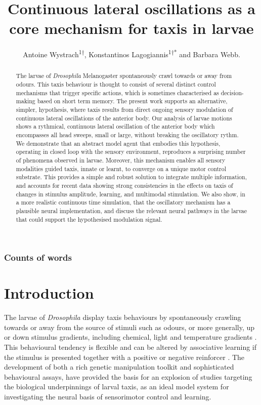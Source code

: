 \documentclass[10pt,a4paper]{article}
\author{Antoine Wystrach\textsuperscript{1†}, Konstantinos Lagogiannis\textsuperscript{1†*} and Barbara Webb.}
\title{Continuous lateral oscillations as a core mechanism for taxis in \Dros larvae}
\newcommand\wordcount{}
\newcommand{\Dros }{\emph{Drosophila }}
\begin{document}
\subsubsection*{Counts of words} 
\wordcount

\maketitle
\begin{abstract}
The larvae of \Dros  Melanogaster spontaneously crawl towards or away from odours. This taxis behaviour is thought to consist of several distinct control mechanisms that trigger specific actions, which is sometimes characterised as decision-making based on short term memory. The present work supports an alternative, simpler, hypothesis, where taxis results from direct ongoing sensory modulation of continuous lateral oscillations of the anterior body. Our analysis of larvae motions shows a rythmical, continuous lateral oscillation of the anterior body which encompasses all head sweeps, small or large, without breaking the oscillatory rythm.  We demonstrate that an abstract model agent that embodies this hypothesis, operating in closed loop with the sensory environment, reproduces a surprising number of phenomena observed in larvae. Moreover, this mechanism enables all sensory modalities guided taxis, innate or learnt, to converge on a unique motor control substrate. This provides a simple and robust solution to integrate multiple information, and accounts for recent data showing strong consistencies in the effects on taxis of changes in stimulus amplitude, learning, and multimodal stimulation. We also show, in a more realistic continuous time simulation, that the oscillatory mechanism has a plausible neural implementation, and discuss the relevant neural pathways in the larvae that could support the hypothesised modulation signal.
\end{abstract}

\section{Introduction}
The larvae of \Dros display taxis behaviours by spontaneously crawling towards or away from the source of stimuli such as odours, or more generally, up or down stimulus gradients, including chemical, light and temperature gradients \citep{luo2010navigational,gomez2011active,gomez2012active,gomez2014multilevel,kane2013sensorimotor,klein2015sensory}. This behavioural tendency is flexible and can be altered by associative learning if the stimulus is presented together with a positive or negative reinforcer \citep{ache2005olfaction,scherer2003olfactory,gerber2004engram,diegelmann2013maggot,schleyer2015learning}. The development of both a rich genetic manipulation toolkit and sophisticated behavioural assays, \citep{gerber2009smelling,diegelmann2013maggot} have provided the basis for an explosion of studies targeting the biological underpinnings of larval taxis, as an ideal model system for investigating the neural basis of sensorimotor control and learning.
\end{document}
